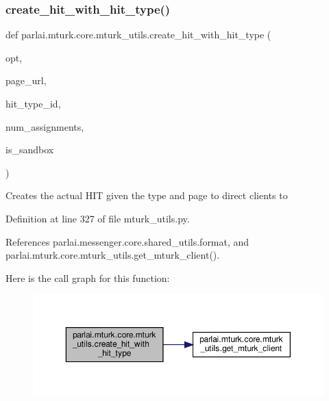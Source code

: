 \subsubsection{\texorpdfstring{create\+\_\+hit\+\_\+with\+\_\+hit\+\_\+type()}{create\_hit\_with\_hit\_type()}}
{\footnotesize\ttfamily def parlai.\+mturk.\+core.\+mturk\+\_\+utils.\+create\+\_\+hit\+\_\+with\+\_\+hit\+\_\+type (\begin{DoxyParamCaption}\item[{}]{opt,  }\item[{}]{page\+\_\+url,  }\item[{}]{hit\+\_\+type\+\_\+id,  }\item[{}]{num\+\_\+assignments,  }\item[{}]{is\+\_\+sandbox }\end{DoxyParamCaption})}

\begin{DoxyVerb}Creates the actual HIT given the type and page to direct clients to\end{DoxyVerb}
 

Definition at line 327 of file mturk\+\_\+utils.\+py.



References parlai.\+messenger.\+core.\+shared\+\_\+utils.\+format, and parlai.\+mturk.\+core.\+mturk\+\_\+utils.\+get\+\_\+mturk\+\_\+client().

Here is the call graph for this function\+:
\nopagebreak
\begin{figure}[H]
\begin{center}
\leavevmode
\includegraphics[width=350pt]{namespaceparlai_1_1mturk_1_1core_1_1mturk__utils_a2e92dde4f8ec17749f22f83b6d362d4f_cgraph}
\end{center}
\end{figure}
\mbox{\label{namespaceparlai_1_1mturk_1_1core_1_1mturk__utils_a389ca1d743e6319cb35916a6b0d7867d}} 
